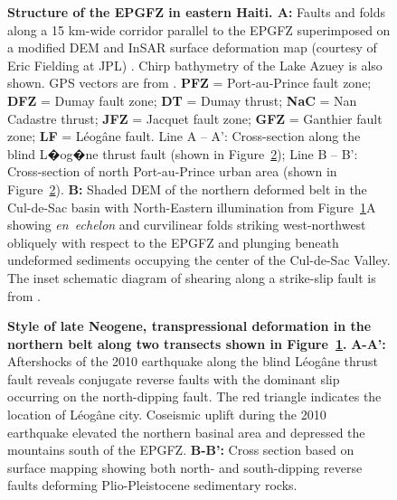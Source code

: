 \documentclass[linenumbers,draft]{agujournal}
\begin{document}
\begin{figure}
\centering
\caption{\textbf{Structure of the EPGFZ in eastern Haiti. A:} Faults and folds along a 15 km-wide corridor parallel to the EPGFZ superimposed on a modified DEM and InSAR surface deformation map (courtesy of Eric Fielding at JPL) \citep{hayes2010complex}. Chirp bathymetry of the Lake Azuey is also shown. GPS vectors are from \citet{calais2010transpressional}. \textbf{PFZ} = Port-au-Prince fault zone; \textbf{DFZ} = Dumay fault zone; \textbf{DT} = Dumay thrust; \textbf{NaC} = Nan Cadastre thrust; \textbf{JFZ} = Jacquet fault zone; \textbf{GFZ} = Ganthier fault zone; \textbf{LF} = L\'eog\^ane fault. Line A -- A': Cross-section along the blind L�og�ne thrust fault (shown in Figure~\ref{figure3}); Line B -- B': Cross-section of north Port-au-Prince urban area (shown in Figure~\ref{figure3}). \textbf{B:} Shaded DEM of the northern deformed belt in the Cul-de-Sac basin with North-Eastern illumination from Figure~\ref{figure2}A showing \textit{en~echelon} and curvilinear folds striking west-northwest obliquely with respect to the EPGFZ and plunging beneath undeformed sediments occupying the center of the Cul-de-Sac Valley. The inset schematic diagram of shearing along a strike-slip fault is from \citet{odonne1983analogue}.}
\label{figure2}
\end{figure}

\begin{figure}
\centering
\caption{\textbf{Style of late Neogene, transpressional deformation in the northern belt along two transects shown in Figure~\ref{figure2}.} \textbf{A-A':} Aftershocks of the 2010 earthquake \citep{douilly2013crustal,douilly2015three} along the blind L\'eog\^ane thrust fault reveals conjugate reverse faults with the dominant slip occurring on the north-dipping fault. The red triangle indicates the location of L\'eog\^ane city. Coseismic uplift during the 2010 earthquake elevated the northern basinal area and depressed the mountains south of the EPGFZ. \textbf{B-B':} Cross section based on surface mapping \citep{massoni1955haiti,cox2011shear,mchugh2011offshore,saint2015seismotectonics} showing both north- and south-dipping reverse faults deforming Plio-Pleistocene sedimentary rocks.}
\label{figure3}
\end{figure}
\end{document}
